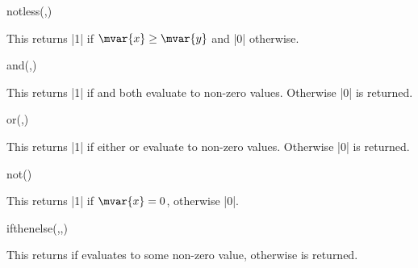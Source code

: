 \begin{math-function}{notless(,)}
\mathcommand

	This returns |1| if $\mvar{x}\geq\mvar{y}$ and |0| otherwise.
	
\begin{codeexample}[]
 \pgfmathresult
\end{codeexample}

\end{math-function}

\begin{math-function}{and(,)}
\mathcommand

	This returns |1| if  and  both evaluate to
	non-zero values. Otherwise |0| is returned.
	
\begin{codeexample}[]
 \pgfmathresult
\end{codeexample}

\end{math-function}

\begin{math-function}{or(,)}
\mathcommand

	This returns |1| if either  or  evaluate to
	non-zero values. Otherwise |0| is returned.
	
\begin{codeexample}[]
 \pgfmathresult
\end{codeexample}

\end{math-function}

\begin{math-function}{not()}
\mathcommand

	This returns |1| if $\mvar{x}=0$, otherwise |0|.
	
\begin{codeexample}[]
 \pgfmathresult
\end{codeexample}

\end{math-function}


\begin{math-function}{ifthenelse(,,)}
\mathcommand

	This returns  if  evaluates to some non-zero value,
	otherwise  is returned.
	
\begin{codeexample}[]
 \pgfmathresult
\end{codeexample}

\end{math-function}

